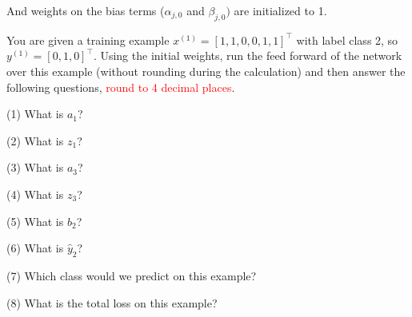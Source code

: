 And weights on the bias terms (${\alpha}_{j,0}$ and ${\beta}_{j,0})$ are initialized to 1.

You are given a training example $x^{(1)}=[1,1,0,0,1,1]^{\top}$ with label class 2, so $y^{(1)}=[0,1,0]^{\top}$. Using the initial weights, run the feed forward of the network over this example (without rounding during the calculation) and then answer the following questions, \textcolor{red}{round to 4 decimal places}.

(1) What is $a_1$?
\begin{tcolorbox}[fit,height=1cm, width=2cm, blank, borderline={1pt}{-2pt}]

\end{tcolorbox}

(2) What is $z_1$?
\begin{tcolorbox}[fit,height=1cm, width=2cm, blank, borderline={1pt}{-2pt}]

\end{tcolorbox}

(3) What is $a_3$?
\begin{tcolorbox}[fit,height=1cm, width=2cm, blank, borderline={1pt}{-2pt}]

\end{tcolorbox}

(4) What is $z_3$?
\begin{tcolorbox}[fit,height=1cm, width=2cm, blank, borderline={1pt}{-2pt}]

\end{tcolorbox}

(5) What is $b_2$?
\begin{tcolorbox}[fit,height=1cm, width=2cm, blank, borderline={1pt}{-2pt}]

\end{tcolorbox}

(6) What is $\hat{y}_2$?
\begin{tcolorbox}[fit,height=1cm, width=2cm, blank, borderline={1pt}{-2pt}]

\end{tcolorbox}

(7) Which class would we predict on this example?
\begin{tcolorbox}[fit,height=1cm, width=2cm, blank, borderline={1pt}{-2pt}]

\end{tcolorbox}

(8) What is the total loss on this example?
\begin{tcolorbox}[fit,height=1cm, width=2cm, blank, borderline={1pt}{-2pt}]

\end{tcolorbox}



